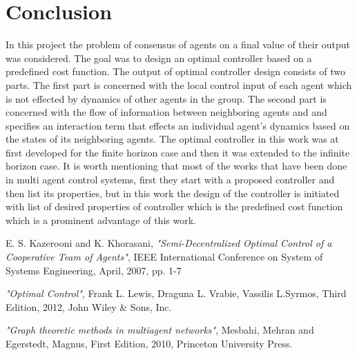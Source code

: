 \documentclass[conference]{IEEEtran}
\begin{document}
\section{Conclusion}
 In this project the problem of consensus of agents on a final value of their output was considered. The goal was to design an optimal controller based on a predefined cost function. The output of optimal controller design consists of two parts. The first part is concerned with the local control input of each agent which is not effected by dynamics of other agents in the group. The second part is concerned with the flow of information between neighboring agents and and specifies an interaction term that effects an individual agent's dynamics based on the states of its neighboring agents. The optimal controller in this work was at first developed for the finite horizon case and then it was extended to the infinite horizon case. It is worth mentioning that most of the works that have been done in multi agent control systems, first they start with a proposed controller and then list its properties, but in this work the design of the controller is initiated with list of desired properties of controller which is the predefined cost function which is a prominent advantage of this work.

\begin{thebibliography}{1}

E. S. Kazerooni and K. Khorasani, \emph{"Semi-Decentralized Optimal Control of a Cooperative Team of Agents"},
\relax IEEE International Conference on System of Systems Engineering, April, 2007, pp. 1-7

\emph{"Optimal Control"}, Frank L. Lewis, Draguna L. Vrabie, Vassilis L.Syrmos,
\relax Third Edition, 2012, John Wiley \& Sons, Inc.

\emph{"Graph theoretic methods in multiagent networks"}, Mesbahi, Mehran and Egerstedt, Magnus,
\relax First Edition, 2010, Princeton University Press.

\end{thebibliography}
\end{document}
